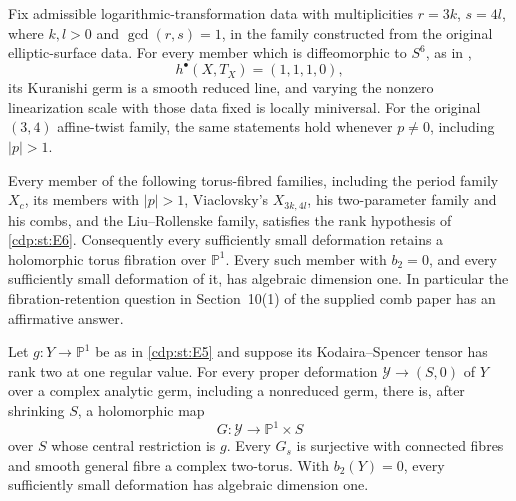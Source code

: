 
\begin{proposition}\hypertarget{tag-01GI}{}\label{cdp:st:E11}


Fix admissible logarithmic-transformation data with multiplicities
$r=3k$, $s=4l$, where $k,l>0$ and $\gcd(r,s)=1$, in the family
constructed from the original elliptic-surface data. For every member
which is diffeomorphic to $S^6$, as in
\cite[Theorem labelled \texttt{t:main}]{Viaclovsky2026Log},
\[
 h^\bullet(X,T_X)=(1,1,1,0),
\]
its Kuranishi germ is a smooth reduced line, and varying the nonzero
linearization scale with those data fixed is locally miniversal.
For the original $(3,4)$ affine-twist family, the same statements
hold whenever $p\ne0$, including $|p|>1$.
\end{proposition}

\begin{proposition}\hypertarget{tag-01GW}{}\label{cdp:st:E7}


Every member of the following torus-fibred families,
including the period family $X_c$, its members with $|p|>1$,
Viaclovsky's $X_{3k,4l}$, his two-parameter family and his combs,
and the Liu--Rollenske family, satisfies the rank hypothesis of \ref{cdp:st:E6}.
Consequently every sufficiently small deformation retains a
holomorphic torus fibration over $\mathbb P^1$. Every such member
with $b_2=0$, and every sufficiently small deformation of it, has
algebraic dimension one. In particular the fibration-retention
question in Section~10(1) of the supplied comb paper has an
affirmative answer.
\end{proposition}

\begin{proposition}\hypertarget{tag-01GV}{}\label{cdp:st:E6}


Let $g:Y\to\mathbb P^1$ be as in \ref{cdp:st:E5} and suppose its
Kodaira--Spencer tensor has rank two at one regular value. For every
proper deformation $\mathcal Y\to(S,0)$ of $Y$ over a complex
analytic germ, including a nonreduced germ, there is, after shrinking
$S$, a holomorphic map
\[
 G:\mathcal Y\longrightarrow\mathbb P^1\times S
\]
over $S$ whose central restriction is $g$. Every $G_s$ is surjective
with connected fibres and smooth general fibre a complex two-torus.
With $b_2(Y)=0$, every sufficiently small deformation has algebraic
dimension one.
\end{proposition}

